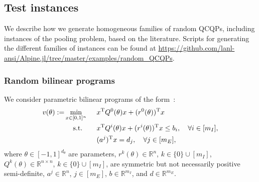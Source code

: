 \documentclass{article}
\newcommand{\R}{\mathbb{R}}
\begin{document}
\subsection{Test instances}
\label{subsec:test_instances}

We describe how we generate homogeneous families of random QCQPs, including instances of the pooling problem, based on the literature.
Scripts for generating the different families of instances can be found at \url{https://github.com/lanl-ansi/Alpine.jl/tree/master/examples/random_QCQPs}.


\subsubsection{Random bilinear programs}
\label{subsubsec:random_bilinear}

We consider parametric bilinear programs of the form~\cite{bao2011semidefinite}:
\begin{alignat*}{2}
v(\theta) := &\min_{x \in [0,1]^{n}} \:\: && x^{\textup{T}} Q^0(\theta) x + (r^0(\theta))^{\textup{T}} x \\
&\quad\: \text{s.t.} && x^{\textup{T}} Q^i(\theta) x + (r^i(\theta))^{\textup{T}} x \leq b_i, \quad \forall i \in [m_I], \\
& && (a^j)^{\textup{T}} x = d_j, \quad \forall j \in [m_E],
\end{alignat*}
where $\theta \in [-1,1]^{d_{\theta}}$ are parameters,
$r^k(\theta) \in \R^n$, $k \in \{0\} \cup [m_I]$, $Q^k(\theta) \in \R^{n \times n}$, $k \in \{0\} \cup [m_I]$, are symmetric but not necessarily positive semi-definite, $a^j \in \R^n$, $j \in [m_E]$, $b \in \R^{m_I}$, and $d \in \R^{m_E}$.
\end{document}
